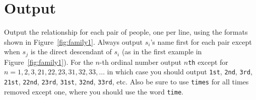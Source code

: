 \section*{Output}

Output the relationship for each pair of people, one per line, using the formats shown in Figure~\ref{fig:family1}.  Always output $s_i$'s name first for each pair except when $s_j$ is the direct descendant of $s_i$ (as in the first example in Figure~\ref{fig:family1}).  For the $n$-th ordinal number output {\tt $n$th} except for $n=1,2,3,21,22,23,31,32,33,\ldots$  in which case you should output {\tt 1st}, {\tt 2nd}, {\tt 3rd}, {\tt 21st}, {\tt 22nd}, {\tt 23rd}, {\tt 31st}, {\tt 32nd}, {\tt 33rd}, etc.  Also be sure to use {\tt times} for all times removed except one, where you should use the word {\tt time}.
